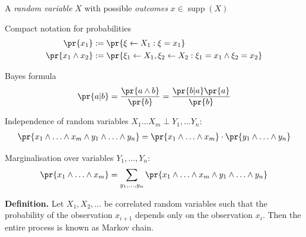 \documentclass[landscape,footrule]{foils}
\DeclareMathOperator{\supp}{supp}
\begin{document}
\titlefoil





\enlargethispage{0.9cm}
\begin{triangles}
\item A \emph{random variable} $X$ with possible \emph{outcomes} $x\in\supp(X)$
\item Compact notation for probabilities \vspace*{-1ex}
\begin{align*}
\pr{x_1}&:=\pr{\xi\gets X_1: \xi=x_1}\\
\pr{x_1\wedge x_2}&:=\pr{\xi_1\gets X_1,\xi_2\gets X_2 : \xi_1=x_1\wedge \xi_2=x_2}
\end{align*}\vspace*{-4ex}
\item Bayes formula \vspace*{-2ex}
\begin{align*}
\pr{a|b}=\frac{\pr{a\wedge b}}{\pr{b}}=\frac{\pr{b|a}\pr{a}}{\pr{b}}
\end{align*}\vspace*{-4ex}
\item Independence of random variables $X_1\ldots X_m\perp Y_1,\ldots Y_n$: \vspace*{-1ex}
\begin{align*}
 \pr{x_1\wedge\ldots\wedge x_m\wedge y_1\wedge\ldots\wedge y_n}=\pr{x_1\wedge\ldots\wedge x_m}\cdot\pr{y_1\wedge\ldots\wedge y_n}
\end{align*}\vspace*{-4ex}
\item Marginalisation over variables $Y_1,\ldots, Y_n$: \vspace*{-1ex}
\begin{align*}
 \pr{x_1\wedge\ldots\wedge x_m}=\sum_{y_1,\ldots,y_n}\pr{x_1\wedge\ldots\wedge x_m \wedge y_1\wedge\ldots\wedge y_n}
\end{align*} 
\end{triangles}



\textbf{Definition.}
Let $X_1, X_2,\ldots$ be correlated random variables such that the probability of the observation $x_{i+1}$ depends only on the observation $x_{i}$.
Then the entire process is known as Markov chain.
\end{document}

